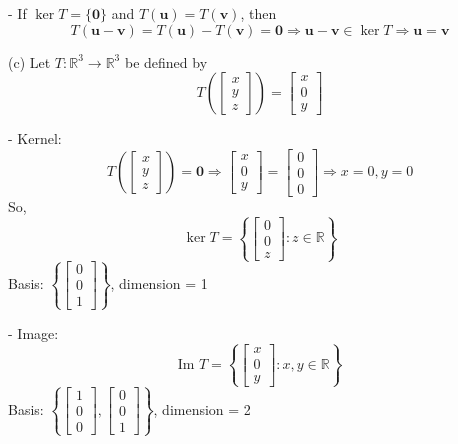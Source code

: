 \documentclass[12pt]{article}
\begin{document}
\begin{enumerate}
-  If \( \ker T = \{ \mathbf{0} \} \) and \( T(\mathbf{u}) = T(\mathbf{v}) \), then
  \[
  T(\mathbf{u} - \mathbf{v}) = T(\mathbf{u}) - T(\mathbf{v}) = \mathbf{0} \Rightarrow \mathbf{u} - \mathbf{v} \in \ker T \Rightarrow \mathbf{u} = \mathbf{v}
  \]

(c) Let \( T: \mathbb{R}^3 \to \mathbb{R}^3 \) be defined by
\[
T\left( \begin{bmatrix} x \\ y \\ z \end{bmatrix} \right) = \begin{bmatrix} x \\ 0 \\ y \end{bmatrix}
\]

- Kernel:
  \[
  T\left( \begin{bmatrix} x \\ y \\ z \end{bmatrix} \right) = \mathbf{0} \Rightarrow
  \begin{bmatrix} x \\ 0 \\ y \end{bmatrix} = \begin{bmatrix} 0 \\ 0 \\ 0 \end{bmatrix}
  \Rightarrow x = 0, y = 0
  \]
  So,
  \[
  \ker T = \left\{ \begin{bmatrix} 0 \\ 0 \\ z \end{bmatrix} : z \in \mathbb{R} \right\}
  \]
  Basis: \( \left\{ \begin{bmatrix} 0 \\ 0 \\ 1 \end{bmatrix} \right\} \), dimension = 1

- Image:
  \[
  \text{Im } T = \left\{ \begin{bmatrix} x \\ 0 \\ y \end{bmatrix} : x, y \in \mathbb{R} \right\}
  \]
  Basis: \( \left\{ \begin{bmatrix} 1 \\ 0 \\ 0 \end{bmatrix}, \begin{bmatrix} 0 \\ 0 \\ 1 \end{bmatrix} \right\} \), dimension = 2


\end{enumerate}
\end{document}
